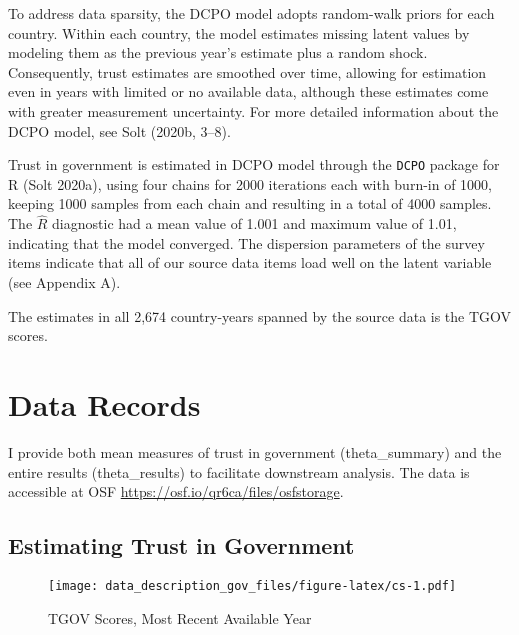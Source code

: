 \documentclass[
  12pt,
]{article}
\begin{document}
To address data sparsity, the DCPO model adopts random-walk priors for each country.
Within each country, the model estimates missing latent values by modeling them as the previous year's estimate plus a random shock.
Consequently, trust estimates are smoothed over time, allowing for estimation even in years with limited or no available data, although these estimates come with greater measurement uncertainty.
For more detailed information about the DCPO model, see Solt (2020b, 3--8).

Trust in government is estimated in DCPO model through the \texttt{DCPO} package for R (Solt 2020a), using four chains for 2000 iterations each with burn-in of 1000, keeping 1000 samples from each chain and resulting in a total of 4000 samples.
The \(\hat{R}\) diagnostic had a mean value of 1.001 and maximum value of 1.01, indicating that the model converged.
The dispersion parameters of the survey items indicate that all of our source data items load well on the latent variable (see Appendix A).

The estimates in all 2,674 country-years spanned by the source data is the TGOV scores.

\section{Data Records}\label{data-records}

I provide both mean measures of trust in government (theta\_summary) and the entire results (theta\_results) to facilitate downstream analysis.
The data is accessible at OSF \url{https://osf.io/qr6ca/files/osfstorage}.

\subsection{Estimating Trust in Government}\label{estimating-trust-in-government}

\begin{figure}
\centering
\texttt{[image: data\_description\_gov\_files/figure-latex/cs-1.pdf]}
\caption{\label{fig:cs}TGOV Scores, Most Recent Available Year \label{cs_mry}}
\end{figure}
\end{document}

